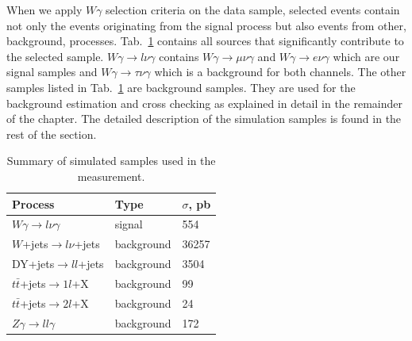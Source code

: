 When we apply $W\gamma$ selection criteria on the data sample, selected events contain not only the events originating from the signal process but also events from other, background, processes. Tab.~\ref{tab:mc_bkg_samples} contains all sources that significantly contribute to the selected sample. $W\gamma \rightarrow l\nu\gamma$ contains $W\gamma \rightarrow \mu\nu\gamma$ and $W\gamma \rightarrow e\nu\gamma$ which are our signal samples and $W\gamma \rightarrow \tau\nu\gamma$ which is a background for both channels. The other samples listed in Tab.~\ref{tab:mc_bkg_samples} are background samples. They are used for the background estimation and cross checking as explained in detail in the remainder of the chapter. The detailed description of the simulation samples is found in the rest of the section.

\begin{table}[h]
  \small
  \begin{center}
    \caption{Summary of simulated samples used in the measurement.}
    \begin{tabular}{|l|l|l|}
      \hline
      Process                              & Type & $\sigma$, pb  \\ \hline
      $W\gamma \rightarrow l\nu\gamma$     & signal & 554   \\ \hline %
      $W$+jets$ \rightarrow l\nu $+jets   & background & 36257  \\ \hline %
      DY+jets$ \rightarrow ll $+jets     & background & 3504  \\ \hline %
      $t\bar{t}$+jets$\rightarrow 1l$+X    & background & 99    \\ \hline %
      $t\bar{t}$+jets$\rightarrow 2l$+X    & background & 24    \\ \hline
      $Z\gamma \rightarrow ll\gamma$       & background & 172   \\ \hline
    \end{tabular}
    \label{tab:mc_bkg_samples}
  \end{center}
\end{table} 

